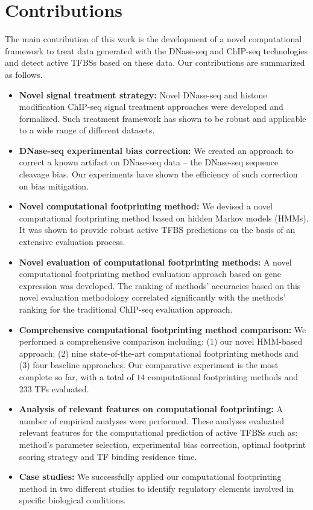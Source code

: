 \section{Contributions}
\label{sec:contributions}

The main contribution of this work is the development of a novel computational framework to treat data generated with the DNase-seq and ChIP-seq technologies and detect active TFBSs based on these data. Our contributions are summarized as follows.

\begin{itemize}
  \item \textbf{Novel signal treatment strategy:} Novel DNase-seq and histone modification ChIP-seq signal treatment approaches were developed and formalized. Such treatment framework has shown to be robust and applicable to a wide range of different datasets.
  \item \textbf{DNase-seq experimental bias correction:} We created an approach to correct a known artifact on DNase-seq data -- the DNase-seq sequence cleavage bias. Our experiments have shown the efficiency of such correction on bias mitigation.
  \item \textbf{Novel computational footprinting method:} We devised a novel computational footprinting method based on hidden Markov models (HMMs). It was shown to provide robust active TFBS predictions on the basis of an extensive evaluation process.
  \item \textbf{Novel evaluation of computational footprinting methods:} A novel computational footprinting method evaluation approach based on gene expression was developed. The ranking of methods' accuracies based on this novel evaluation methodology correlated significantly with the methods' ranking for the traditional ChIP-seq evaluation approach.
  \item \textbf{Comprehensive computational footprinting method comparison:} We performed a comprehensive comparison including: (1) our novel HMM-based approach; (2) nine state-of-the-art computational footprinting methods and (3) four baseline approaches. Our comparative experiment is the most complete so far, with a total of $14$ computational footprinting methods and $233$ TFs evaluated.
  \item \textbf{Analysis of relevant features on computational footprinting:} A number of empirical analyses were performed. These analyses evaluated relevant features for the computational prediction of active TFBSs such as: method's parameter selection, experimental bias correction, optimal footprint scoring strategy and TF binding residence time.
  \item \textbf{Case studies:} We successfully applied our computational footprinting method in two different studies to identify regulatory elements involved in specific biological conditions.
\end{itemize}

